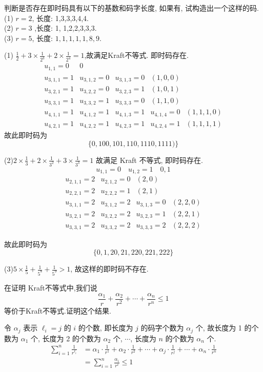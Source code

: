 \begin{exercise}
 判断是否存在即时码具有以下的基数和码字长度, 如果有, 试构造出一个这样的码.\\
(1) $ r=2 $, 长度: 1,3,3,3,4,4.\\
(2) $ r=3 $ ,长度: 1, 1,2,2,3,3,3.\\
(3) $ r=5 $, 长度: $ 1,1,1,1,1,8,9 $.

\end{exercise}
\begin{solution}
(1) $ \frac{1}{2}+3 \times \frac{1}{2^{3}}+2 \times \frac{1}{2^{4}}=1 $,故满足Kraft不等式. 即时码存在.
$$
\begin{array}{lllll}
u_{1,1}=0 & 0 & & &\\
u_{3,1,1}=1 & u_{3,1,2}=0 & u_{3,1,3}=0 & (1,0,0) &\\
u_{3,2,1}=1 & u_{3,2,2}=0 & u_{3,2,3}=1 & (1,0,1) &\\
u_{3,3,1}=1 & u_{3,3,2}=1 & u_{3,3,3}=0 & (1,1,0) &\\
u_{4,1,1}=1 & u_{4,1,2}=1 & u_{4,1,3}=1 & u_{4,1,4}=0 & (1,1,1,0)\\
u_{4,2,1}=1 & u_{4,2,2}=1 & u_{4,2,3}=1 & u_{4,2,4}=1& (1,1,1,1)
\end{array}
$$
故此即时码为
$$
\{0,100,101,110,1110,1111)\}
$$

(2)$ 2 \times \frac{1}{3}+2 \times \frac{1}{3^{2}}+3 \times \frac{1}{3^{3}}=1 $ 故满足 Kraft 不等式, 即时码存在.
$$
u_{1,1}=0 \quad u_{1,2}=1 \quad 0,1
$$
$$
\begin{array}{llrl}
u_{2,1,1}=2 & u_{2,1,2}=0 & (2,0) & \\
u_{2,2,1}=2 & u_{2,2,2}=1 & (2,1) & \\
u_{3,1,1}=2 & u_{3,1,2}=2 & u_{3,1,3}=0 & (2,2,0) \\
u_{3,2,1}=2 & u_{3,2,2}=2 & u_{3,2,3}=1 & (2,2,1) \\
u_{3,3,1}=2 & u_{3,3,2}=2 & u_{3,3,3}=2 & (2,2,2)
\end{array}
$$

故此即时码为
$$
\{0,1,20,21,220,221,222\}
$$

(3)$ 5 \times \frac{1}{5}+\frac{1}{5^{8}}+\frac{1}{5^{9}}>1 $, 故这样的即时码不存在.
\end{solution}


\begin{exercise}
在证明 Kraft不等式中,我们说
$$
\frac{\alpha_{1}}{r}+\frac{\alpha_{2}}{r^{2}}+\cdots+\frac{\alpha_{n}}{r^{n}} \leq 1
$$
等价于Kraft不等式.证明这个结果.
\end{exercise}
\begin{solution}
令 $ \alpha_{j} $ 表示 $ \ell_{i}=j $ 的 $ i $ 的个数, 即长度为 $ j $ 的码字个数为 $ \alpha_{j} $ 个, 故长度为 1 的个数为 $ \alpha_{1} $ 个, 长度为 2 的个数为 $ \alpha_{2} $ 个, $ \cdots $, 长度为 $ n $ 的个数为 $ \alpha_{n} $ 个.
$$
\begin{aligned}
\sum_{i=1}^{n} \frac{1}{r^{\ell_{i}}} & =\alpha_{1} \cdot \frac{1}{r^{1}}+\alpha_{2} \cdot \frac{1}{r^{2}}+\cdots+\alpha_{j} \cdot \frac{1}{r^{j}}+\cdots+\alpha_{n} \cdot \frac{1}{r^{n}} \\
& =\sum_{i=1}^{n} \frac{\alpha_{i}}{r^{i}} \leq 1
\end{aligned}
$$
\end{solution}


